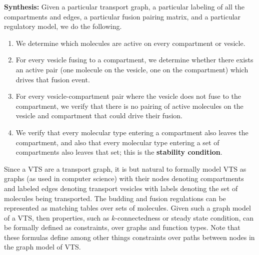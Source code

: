 \textbf{Synthesis:} Given a particular transport graph, a particular labeling of all the compartments and edges, a particular fusion pairing matrix, and a particular regulatory model, we do the following.

\begin{enumerate}
\item We determine which molecules are active on every compartment or vesicle.
\item For every vesicle fusing to a compartment, we determine whether there exists an active pair (one molecule on the vesicle, one on the compartment) which drives that fusion event.
\item For every vesicle-compartment pair where the vesicle does not fuse to the compartment, we verify that there is no pairing of active molecules on the
vesicle and compartment that could drive their fusion.
\item We verify that every molecular type entering a compartment also leaves the compartment, and also that every molecular type entering a set of compartments also leaves that set; this is the \textbf{stability condition}.
\end{enumerate}


\label{subsec:graphmodel}
Since a VTS are a transport graph, it is but natural to formally model VTS as graphs (as used in computer science) with their nodes denoting compartments and labeled edges denoting transport vesicles with labels denoting the set of molecules being transported.  The budding and fusion regulations can be represented as matching tables over sets of molecules.
Given such a graph model of a VTS, then properties, such as $k$-connectedness or steady state condition, can be formally defined as constraints, 
over graphs and function types.  Note that these formulas define among other things constraints over paths between nodes in the graph model of VTS. 
   

